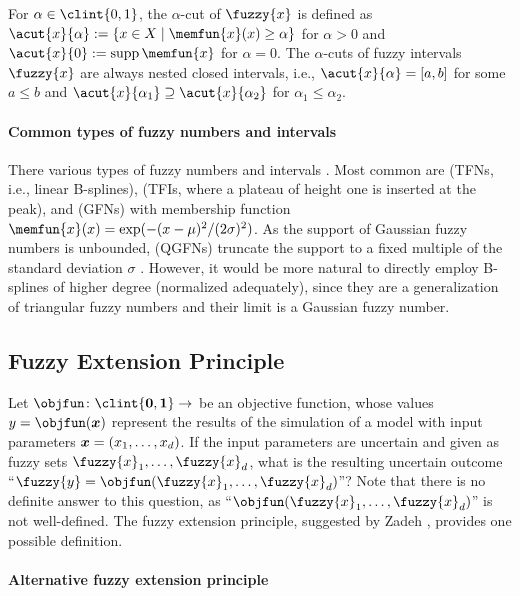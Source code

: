 For $\alpha \in \clint{0, 1}$, the $\alpha$-cut of $\fuzzy{x}$ is
defined as $\acut{x}{\alpha} := \{x \in X \mid \memfun{x}(x) \ge \alpha\}$
for $\alpha > 0$ and $\acut{x}{0} := \supp \memfun{x}$ for $\alpha = 0$.
The $\alpha$-cuts of fuzzy intervals $\fuzzy{x}$ are always
nested closed intervals, i.e.,
$\acut{x}{\alpha} = [a, b]$ for some $a \le b$ and
$\acut{x}{\alpha_1} \supset \acut{x}{\alpha_2}$ for $\alpha_1 \le \alpha_2$.

\paragraph{Common types of fuzzy numbers and intervals}

There various types of fuzzy numbers and intervals \cite{Klimke06Uncertainty}.
Most common are
 (TFNs, i.e., linear B-splines),
(TFIs, where a plateau of height one is inserted at the peak), and
 (GFNs) with membership function
$\memfun{x}(x) = \exp(-(x - \mu)^2/(2\sigma)^2)$.
As the support of Gaussian fuzzy numbers is unbounded,
 (QGFNs) truncate the support
to a fixed multiple of the standard deviation $\sigma$
\cite{Klimke06Uncertainty}.
However, it would be more natural to directly employ B-splines of
higher degree (normalized adequately), since they are a generalization
of triangular fuzzy numbers and their limit is a Gaussian fuzzy number.



\subsection{Fuzzy Extension Principle}
\label{sec:552fuzzyExtensionPrinciple}

Let $\objfun\colon \clint{\*0, \*1} \to \real$ be an objective function,
whose values $y = \objfun(\*x)$ represent the results of the
simulation of a model with input parameters ${\boldsymbol{x}} = (x_1, \dotsc, x_d)$.
If the input parameters are uncertain and
given as fuzzy sets $\fuzzy{x}_1, \dotsc, \fuzzy{x}_d$,
what is the resulting uncertain outcome
``$\fuzzy{y} = \objfun(\fuzzy{x}_1, \dotsc, \fuzzy{x}_d)$''?
Note that there is no definite answer to this question,
as ``$\objfun(\fuzzy{x}_1, \dotsc, \fuzzy{x}_d)$'' is not well-defined.
The fuzzy extension principle, suggested by Zadeh \cite{Zadeh75Concept},
provides one possible definition.

\paragraph{Alternative fuzzy extension principle}

